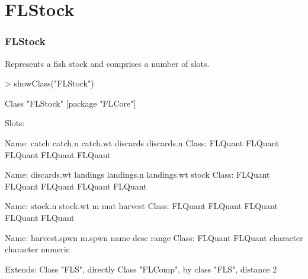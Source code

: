 \documentclass{beamer}%
\begin{document}
\section{FLStock}
\begin{frame}[containsverbatim]
  \frametitle{FLStock}
Represents a fish stock and comprises a number of slots.
{\scriptsize{
\begin{Schunk}
\begin{Sinput}
> showClass("FLStock")
\end{Sinput}
\begin{Soutput}
Class "FLStock" [package "FLCore"]

Slots:
                                                                       
Name:         catch      catch.n     catch.wt     discards   discards.n
Class:      FLQuant      FLQuant      FLQuant      FLQuant      FLQuant
                                                                       
Name:   discards.wt     landings   landings.n  landings.wt        stock
Class:      FLQuant      FLQuant      FLQuant      FLQuant      FLQuant
                                                                       
Name:       stock.n     stock.wt            m          mat      harvest
Class:      FLQuant      FLQuant      FLQuant      FLQuant      FLQuant
                                                                       
Name:  harvest.spwn       m.spwn         name         desc        range
Class:      FLQuant      FLQuant    character    character      numeric

Extends: 
Class "FLS", directly
Class "FLComp", by class "FLS", distance 2
\end{Soutput}
\end{Schunk}
}}
\end{frame}

\end{document}
